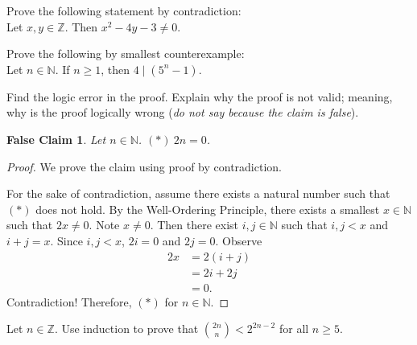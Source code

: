 \documentclass{article}
\newcommand{\Z}{\mathbb{Z}}
\newcommand{\N}{\mathbb{N}}
\newtheorem*{falseclaim}{False Claim}
\theoremstyle{definition}
\begin{document}
\begin{question}{5}
    Prove the following statement by contradiction:\\
    Let $x, y\in \Z$. Then $x^2-4y-3\neq 0$.
\end{question}
\begin{solution}
\end{solution}

\begin{question}{6}
    Prove the following by smallest counterexample:\\
    Let $n\in \mathbb{N}$. If $n\geq 1$, then $4 \mid (5^n-1)$.
\end{question}
\begin{solution}
\end{solution}

\begin{question}{4}
    Find the logic error in the proof. Explain why the proof is not valid; meaning, why is the proof logically wrong (\textit{do not say because the claim is false}).
    \begin{falseclaim}
    Let $n\in \mathbb{N}$. $(*) \ 2n=0$.
    \end{falseclaim}
    
    \begin{proof}
    We prove the claim using proof by contradiction.
    
     For the sake of contradiction, assume there exists a natural number such that $(*)$ does not hold. By the Well-Ordering Principle, there exists a smallest $x\in \N$ such that $2x\neq 0$. Note $x\neq 0$. Then there exist  $i, j\in \N$ such that $i, j<x$ and $i+j=x$. Since $i, j <x$, $2i=0$ and $2j=0$. Observe
      \begin{align*}
      2x &= 2(i+j)\\
      & = 2i+2j\\
      & = 0.
      \end{align*}
      Contradiction! Therefore, $(*)$ for $n\in \N$.
    \end{proof}
\end{question}
\begin{solution}
\end{solution}

\begin{question}{10}
    Let $n\in \Z$. Use induction to prove that $\binom{2n}{n} < 2^{2n-2}$ for all $n\geq 5$. 
\end{question}
\begin{solution}
\end{solution}
\end{document}
